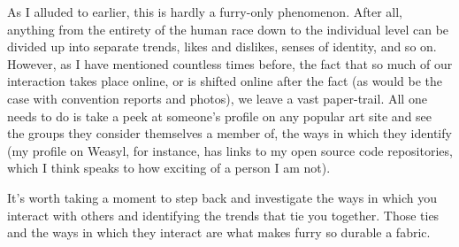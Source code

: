 As I alluded to earlier, this is hardly a furry-only phenomenon. After all, anything from the entirety of the human race down to the individual level can be divided up into separate trends, likes and dislikes, senses of identity, and so on. However, as I have mentioned countless times before, the fact that so much of our interaction takes place online, or is shifted online after the fact (as would be the case with convention reports and photos), we leave a vast paper-trail. All one needs to do is take a peek at someone's profile on any popular art site and see the groups they consider themselves a member of, the ways in which they identify (my profile on Weasyl, for instance, has links to my open source code repositories, which I think speaks to how exciting of a person I am not).

It's worth taking a moment to step back and investigate the ways in which you interact with others and identifying the trends that tie you together. Those ties and the ways in which they interact are what makes furry so durable a fabric.
